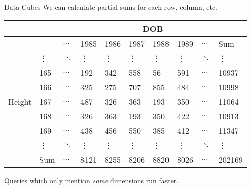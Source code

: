 \documentclass{beamer}
\theoremstyle{definition}
\theoremstyle{definition}
\begin{document}
\begin{frame}{Data Cubes}
    We can calculate partial sums for each row, column, etc.\cite{Gray96}
    \begin{table}[h]\footnotesize
        \begin{tabular} { | l | l | l | l | l | l | l | l | l | l |}
        \hline
        & & \multicolumn{8}{|c|}{DOB} \\ \hline
        & & $\hdots$ & 1985 & 1986 & 1987 & 1988 & 1989 & $\hdots$ & Sum \\ \hline
        \multirow{7}{*}{Height}
        & \vdots & $\ddots$ & \vdots & \vdots & \vdots & \vdots & \vdots & $\ddots$ & \vdots \\
        & 165 & $\hdots$ & 192 & 342 & 558 & 56 & 591 & $\hdots$ & 10937 \\
        & 166 & $\hdots$ & 325 & 275 & 707 & 855 & 484 & $\hdots$ & 10998 \\
        & 167 & $\hdots$ & 487 & 326 & 363 & 193 & 350 & $\hdots$ & 11064 \\
        & 168 & $\hdots$ & 326 & 363 & 193 & 350 & 422 & $\hdots$ & 10913 \\
        & 169 & $\hdots$ & 438 & 456 & 550 & 385 & 412 & $\hdots$ & 11347 \\
        & \vdots & $\ddots$ & \vdots & \vdots & \vdots & \vdots & \vdots & $\ddots$ & \vdots \\
        & Sum & $\hdots$ & 8121 & 8255 & 8206 & 8820 & 8026 & $\hdots$ & 202169 \\
        \hline
        \end{tabular}
    \end{table}

    Queries which only mention \textit{some} dimensions run faster.
\end{frame}
\end{document}
